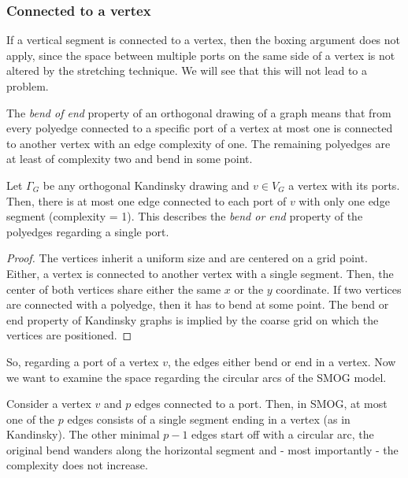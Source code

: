 \subsubsection{Connected to a vertex}
If a vertical segment is connected to a vertex, then the boxing argument does not apply, since the space between multiple ports on the same side of a vertex is not altered by the stretching technique. We will see that this will not lead to a problem.
\begin{definition}
	The \textit{bend of end} property of an orthogonal drawing of a graph means that from every polyedge connected to a specific port of a vertex at most one is connected to another vertex with an edge complexity of one. The remaining polyedges are at least of complexity two and bend in some point.
\end{definition}
\begin{lemma}
	Let $\Gamma_G$ be any orthogonal Kandinsky drawing and $v \in V_G$ a vertex with its ports. Then, there is at most one edge connected to each port of $v$ with only one edge segment (complexity = 1). This describes the \textit{bend or end} property of the polyedges regarding a single port.\label{lem:bend_or_end}
\end{lemma}
\begin{proof}
	The vertices inherit a uniform size and are centered on a grid point. Either, a vertex is connected to another vertex with a single segment. Then, the center of both vertices share either the same $x$ or the $y$ coordinate. If two vertices are connected with a polyedge, then it has to bend at some point. The bend or end property of Kandinsky graphs is implied by the coarse grid on which the vertices are positioned. 
\end{proof}
So, regarding a port of a vertex $v$, the edges either bend or end in a vertex. Now we want to examine the space regarding the circular arcs of the SMOG model.
\begin{lemma}
	Consider a vertex $v$ and $p$ edges connected to a port. Then, in SMOG, at most one of the $p$ edges consists of a single segment ending in a vertex (as in Kandinsky). The other minimal $p-1$ edges start off with a circular arc, the original bend wanders along the horizontal segment and - most importantly - the complexity does not increase.\label{lem:Kandinsky_bend}
\end{lemma}
